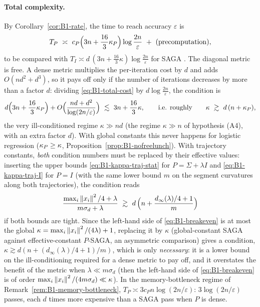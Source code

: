 \paragraph{Total complexity.}
By Corollary~\ref{cor:B1-rate}, the time to reach accuracy $\varepsilon$ is
\begin{equation}\label{eq:B1-total-cost}
T_P\ \asymp\ c_P\Big(3n+\frac{16}{3}\kappaP\Big)\log\frac{2n}{\varepsilon}\ +\ \text{(precomputation)},
\end{equation}
to be compared with $T_I\asymp d\,(3n+\frac{16}{3}\kappa)\log\frac{2n}{\varepsilon}$ for SAGA
\cite[Sec.~5.4.4]{bach2024learning}. The diagonal metric is free. A dense metric multiplies the
per-iteration cost by $d$ and adds $O(nd^2+d^3)$, so it pays off only if the number of iterations
decreases by more than a factor $d$: dividing \eqref{eq:B1-total-cost} by $d\log\frac{2n}{\varepsilon}$, the
condition is
\[
d\Big(3n+\frac{16}{3}\kappaP\Big)+O\Big(\frac{nd+d^2}{\log(2n/\varepsilon)}\Big)\ \lesssim\ 3n+\frac{16}{3}\kappa,
\qquad\text{i.e. roughly}\qquad \kappa\ \gtrsim\ d\,(n+\kappaP),
\]
the very ill-conditioned regime $\kappa\gg nd$ (the regime $\kappa\gg n$ of hypothesis (A4), with an extra
factor $d$). With global constants this never happens for logistic regression ($\kappa_P\ge\kappa$,
Proposition~\ref{prop:B1-nofreelunch}). With trajectory constants, \emph{both} condition numbers must be
replaced by their effective values: inserting the upper bounds \eqref{eq:B1-kappa-traj-stat} for
$P=\hat\Sigma+\lambda I$ and \eqref{eq:B1-kappa-traj-I} for $P=I$ (with the same lower bound $m$ on the
segment curvatures along both trajectories), the condition reads
\begin{equation}\label{eq:B1-breakeven}
\frac{\max_i\norm{x_i}^2/4+\lambda}{m\sigma_d+\lambda}\ \gtrsim\ d\,\Big(n+\frac{d_\infty(\lambda)/4+1}{m}\Big)
\end{equation}
if both bounds are tight. Since the left-hand side of \eqref{eq:B1-breakeven} is at most the global
$\kappa=\max_i\left\|x_i\right\|^2/(4\lambda)+1$, replacing it by $\kappa$ (global-constant SAGA against
effective-constant $P$-SAGA, an asymmetric comparison) gives a condition,
$\kappa\gtrsim d(n+(d_\infty(\lambda)/4+1)/m)$, which is only \emph{necessary}: it is a lower bound on the
ill-conditioning required for a dense metric to pay off, and it overstates the benefit of the metric when
$\lambda\ll m\sigma_d$ (then the left-hand side of \eqref{eq:B1-breakeven} is of order
$\max_i\left\|x_i\right\|^2/(4m\sigma_d)\ll\kappa$). In the memory-bottleneck regime of
Remark~\ref{rem:B1-memory-bottleneck}, $T_P\asymp3c_Pn\log(2n/\varepsilon)$: $3\log(2n/\varepsilon)$
passes, each $d$ times more expensive than a SAGA pass when $P$ is dense.

